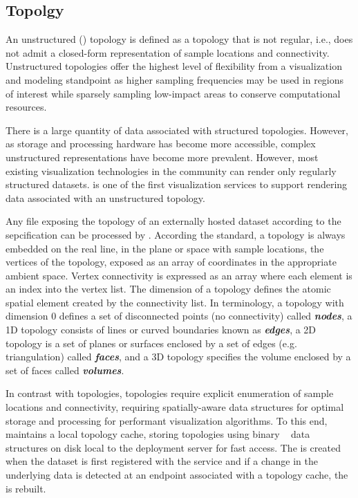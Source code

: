 \subsection{\ugrid{} Topolgy}
An unstructured (\ugrid{}) topology is defined as a topology that is
not regular, i.e., does not admit a closed-form representation of
sample locations and connectivity. Unstructured topologies offer the
highest level of flexibility from a visualization and modeling
standpoint as higher sampling frequencies may be used in regions of
interest while sparsely sampling low-impact areas to conserve
computational resources. 

There is a large quantity of \cf{} data associated with structured
topologies. However, as storage and processing hardware has become
more accessible, complex unstructured representations have become more
prevalent. However, most existing visualization technologies in the
\cf{} community can render only regularly structured
datasets. \sciwms{} is one of the first visualization services to
support rendering data associated with an unstructured topology.

Any \ncml{} file exposing the topology of an externally hosted dataset
according to the \cfugrid{} sepcification can be processed by
\sciwms{}. According the \cfugrid{} standard, a topology is always
embedded on the real line, in the plane or space with sample
locations, the vertices of the topology, exposed as an array of
coordinates in the appropriate ambient space. Vertex connectivity is
expressed as an array where each element is an index into the vertex
list. The dimension of a topology defines the atomic spatial element
created by the connectivity list. In \cfugrid{} terminology, a
topology with dimension 0 defines a set of disconnected points (no
connectivity) called \textbf{\textit{nodes}}, a 1D topology consists
of lines or curved boundaries known as \textbf{\textit{edges}}, a 2D
topology is a set of planes or surfaces enclosed by a set of edges
(e.g. triangulation) called \textbf{\textit{faces}}, and a 3D topology
specifies the volume enclosed by a set of faces called
\textbf{\textit{volumes}}.

In contrast with \cgrid{} topologies, \ugrid{} topologies require
explicit enumeration of sample locations and connectivity, requiring
spatially-aware data structures for optimal storage and processing for
performant visualization algorithms. To this end, \sciwms{} maintains
a local topology cache, storing \ugrid{} topologies using binary
\rtree{}~\cite{Guttman84} data structures on disk local to the
deployment server for fast access. The \rtree{} is created when the
dataset is first registered with the \sciwms{} service and if a change in
the underlying data is detected at an endpoint associated with a
topology cache, the \rtree{} is rebuilt.
